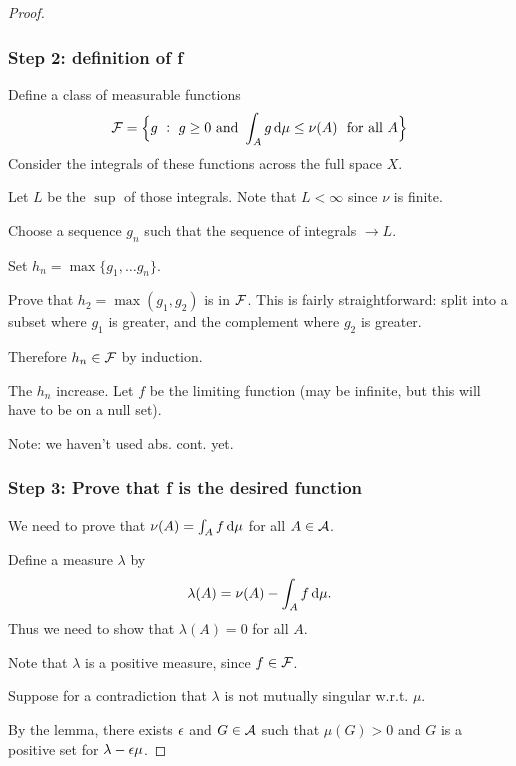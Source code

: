\begin{proof}~\\

  \subsubsection*{Step 2: definition of f}


  Define a class of measurable functions
  \begin{align*}
    \mc F = \Big\{g ~:~ g \geq 0 \text{~and~} \int_A g \d\mu \leq \nu(A) ~\text{~for all~} A\Big\}
  \end{align*}
  Consider the integrals of these functions across the full space $X$.

  Let $L$ be the $\sup$ of those integrals. Note that  $L < \infty$ since $\nu$ is finite.

  Choose a sequence $g_n$ such that the sequence of integrals $\to L$.

  Set $h_n = \max\{g_1, \ldots g_n\}$.

  Prove that $h_2 = \max(g_1, g_2)$ is in $\mathcal F$. This is fairly straightforward: split into a subset
  where $g_1$ is greater, and the complement where $g_2$ is greater.

  Therefore $h_n \in \mathcal F$ by induction.

  The $h_n$ increase. Let $f$ be the limiting function (may be infinite, but this will have to be on a null set).

  Note: we haven't used abs. cont. yet.

  \subsubsection*{Step 3: Prove that f is the desired function}

  We need to prove that $\nu(A) = \int_A f \dmu$ for all $A \in \mathcal A$.

  Define a measure $\lambda$ by
  \begin{align*}
    \lambda(A) = \nu(A) - \int_A f \dmu.
  \end{align*}
  Thus we need to show that $\lambda(A) = 0$ for all $A$.

  Note that $\lambda$ is a positive measure, since $f \in \mathcal F$.

  Suppose for a contradiction that $\lambda$ is not mutually singular w.r.t. $\mu$.

  By the lemma, there exists $\epsilon$ and $G \in \mathcal A$ such that $\mu(G) > 0$ and $G$ is a positive set
  for $\lambda - \epsilon\mu$.


\end{proof}
